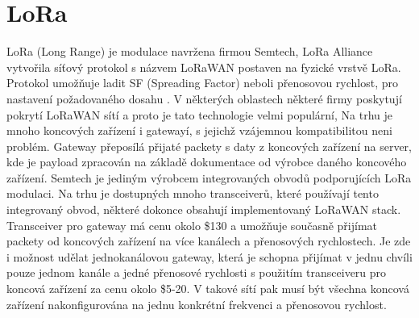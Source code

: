 \section{LoRa}
LoRa (Long Range) je modulace navržena firmou Semtech, LoRa Alliance vytvořila síťový protokol s názvem LoRaWAN postaven na fyzické vrstvě LoRa.
Protokol umožňuje ladit SF (Spreading Factor) neboli přenosovou rychlost, pro nastavení požadovaného dosahu \cite{lorawan_specification}.
V některých oblastech některé firmy poskytují pokrytí LoRaWAN sítí a proto je tato technologie velmi populární, Na trhu je mnoho koncových zařízení i gatewayí, s jejichž vzájemnou kompatibilitou neni problém. Gateway přeposílá přijaté packety s daty z koncových zařízení na server, kde je payload zpracován na základě dokumentace od výrobce daného koncového zařízení.
Semtech je jediným výrobcem integrovaných obvodů podporujících LoRa modulaci. Na trhu je dostupných mnoho transceiverů, které používají tento integrovaný obvod, některé dokonce obsahují implementovaný LoRaWAN stack.
Transceiver pro gateway má cenu okolo \$130 a umožňuje současně přijímat packety od koncových zařízení na více kanálech a přenosových rychlostech. Je zde i možnost udělat jednokanálovou gateway, která je schopna přijímat v jednu chvíli pouze jednom kanále a jedné přenosové rychlosti s použitím transceiveru pro koncová zařízení za cenu okolo \$5-20. V takové sítí pak musí být všechna koncová zařízení nakonfigurována na jednu konkrétní frekvenci a přenosovou rychlost.















